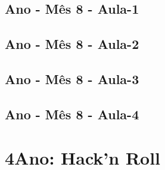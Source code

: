 \begin{multicols}{2}
\section[\sffamily 3\textordmasculine\space Ano - M\^{e}s 8 - Aula-1]{\textordmasculine\space Ano - M\^{e}s 8 - Aula-1}


\section[\sffamily 3\textordmasculine\space Ano - M\^{e}s 8 - Aula-2]{\textordmasculine\space Ano - M\^{e}s 8 - Aula-2}


\section[\sffamily 3\textordmasculine\space Ano - M\^{e}s 8 - Aula-3]{\textordmasculine\space Ano - M\^{e}s 8 - Aula-3}


\section[\sffamily 3\textordmasculine\space Ano - M\^{e}s 8 - Aula-4]{\textordmasculine\space Ano - M\^{e}s 8 - Aula-4}


\end{multicols}

\vfill\null
\pagebreak


\chapter[ 4\textordmasculine\space Ano: Hack'n Roll]{4\textordmasculine\space Ano: Hack'n Roll}\label{chap6}


\pagebreak

\ClearWallPaper



\pagebreak

%

\pagebreak

